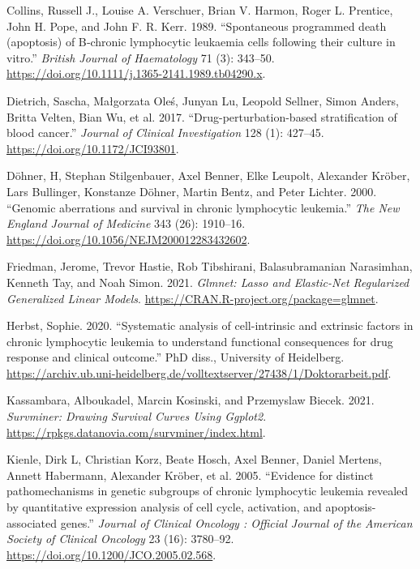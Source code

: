 \documentclass[11pt, a4paper, twosided]{book}
\newenvironment{CSLReferences}%
  {}%
  {\par}
\begin{document}
\begin{CSLReferences}{1}{0}
\leavevmode{}%
Collins, Russell J., Louise A. Verschuer, Brian V. Harmon, Roger L. Prentice, John H. Pope, and John F. R. Kerr. 1989. {``{Spontaneous programmed death (apoptosis) of B‐chronic lymphocytic leukaemia cells following their culture in vitro}.''} \emph{British Journal of Haematology} 71 (3): 343--50. \url{https://doi.org/10.1111/j.1365-2141.1989.tb04290.x}.

\leavevmode{}%
Dietrich, Sascha, Małgorzata Oleś, Junyan Lu, Leopold Sellner, Simon Anders, Britta Velten, Bian Wu, et al. 2017. {``{Drug-perturbation-based stratification of blood cancer}.''} \emph{Journal of Clinical Investigation} 128 (1): 427--45. \url{https://doi.org/10.1172/JCI93801}.

\leavevmode{}%
Döhner, H, Stephan Stilgenbauer, Axel Benner, Elke Leupolt, Alexander Kröber, Lars Bullinger, Konstanze Döhner, Martin Bentz, and Peter Lichter. 2000. {``{Genomic aberrations and survival in chronic lymphocytic leukemia.}''} \emph{The New England Journal of Medicine} 343 (26): 1910--16. \url{https://doi.org/10.1056/NEJM200012283432602}.

\leavevmode{}%
Friedman, Jerome, Trevor Hastie, Rob Tibshirani, Balasubramanian Narasimhan, Kenneth Tay, and Noah Simon. 2021. \emph{Glmnet: Lasso and Elastic-Net Regularized Generalized Linear Models}. \url{https://CRAN.R-project.org/package=glmnet}.

\leavevmode{}%
Herbst, Sophie. 2020. {``{Systematic analysis of cell-intrinsic and extrinsic factors in chronic lymphocytic leukemia to understand functional consequences for drug response and clinical outcome}.''} PhD diss., University of Heidelberg. \url{https://archiv.ub.uni-heidelberg.de/volltextserver/27438/1/Doktorarbeit.pdf}.

\leavevmode{}%
Kassambara, Alboukadel, Marcin Kosinski, and Przemyslaw Biecek. 2021. \emph{Survminer: Drawing Survival Curves Using Ggplot2}. \url{https://rpkgs.datanovia.com/survminer/index.html}.

\leavevmode{}%
Kienle, Dirk L, Christian Korz, Beate Hosch, Axel Benner, Daniel Mertens, Annett Habermann, Alexander Kröber, et al. 2005. {``{Evidence for distinct pathomechanisms in genetic subgroups of chronic lymphocytic leukemia revealed by quantitative expression analysis of cell cycle, activation, and apoptosis-associated genes.}''} \emph{Journal of Clinical Oncology : Official Journal of the American Society of Clinical Oncology} 23 (16): 3780--92. \url{https://doi.org/10.1200/JCO.2005.02.568}.


\end{CSLReferences}
\end{document}
